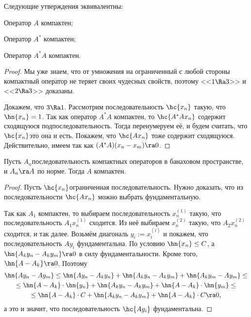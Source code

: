 \documentclass[a4paper]{article}
\newcommand{\n}[1]{^{(#1)}}
\begin{document}
\begin{theorem}Следующие утверждения эквивалентны:
\begin{nums}{-2}
\item Оператор $A$ компактен;
\item Оператор $A^*$ компактен;
\item Оператор $A^*A$ компактен.
\end{nums}
\end{theorem}
\begin{proof}
Мы уже знаем, что от умножения на ограниченный с любой стороны компактный оператор не теряет своих чудесных свойств,
поэтому <<$1 \Ra 3$>> и <<$2\Ra 3$>> доказаны.

Докажем, что $3\Ra 1$. Рассмотрим последовательность $\hc{x_n}$ такую, что $\hn{x_n}=1$. Так как оператор
$A^*A$ компактен, то $\hc{A^*Ax_n}$ содержит сходящуюся подпоследовательность. Тогда перенумеруем её, и будем
считать, что $\hc{x_n}$\т это она и есть. Покажем, что $\hc{Ax_n}$ тоже содержит сходящуюся.
Действительно, имеем
так как $(A^*A)(x_n-x_m)\ra 0$.
\end{proof}

\begin{theorem}
Пусть $A_n$\т последовательность компактных операторов в банаховом пространстве, и $A_n \ra A$ по норме.
Тогда $A$ компактен.
\end{theorem}
\begin{proof}
Пусть $\hc{x_n}$\т ограниченная последовательность. Нужно доказать, что
из последовательности $\hc{Ax_n}$ можно выбрать фундаментальную.

Так как $A_1$ компактен, то выбираем последовательность $x_n\n1$ такую, что
последовательность $A_1 x_n\n1$ сходится. Из неё выбираем $x_n\n2$ такую, что $A_2x_n\n2$ сходится,
и так далее. Возьмём диагональ $y_i := x_i\n i$ и покажем, что последовательность $Ay_i$ фундаментальна.
По условию $\hn{x_n} \le C$, а $\hn{A_k y_n - A_k y_m} \ra 0$ в силу фундаментальности.
Кроме того, $\hn{A - A_k} \ra 0$. Поэтому
\begin{multline*}
\hn{Ay_n-Ay_m} \le \hn{A y_n-A_k y_n} + \hn{A_k y_n - A_k y_m} + \hn{A_k y_m - A y_m} \le \\ \le
\hn{A-A_k}\cdot\hn{y_n} + \hn{A_k y_n - A_k y_m} + \hn{A-A_k}\cdot\hn{y_m}\le \\ \le
\hn{A-A_k}\cdot C + \hn{A_k y_n - A_k y_m} + \hn{A-A_k}\cdot C \ra 0,
\end{multline*}
а это и значит, что последовательность $\hc{A y_i}$ фундаментальна.
\end{proof}
\end{document}
